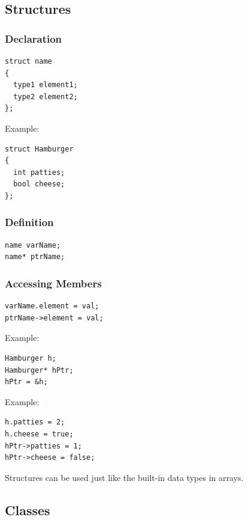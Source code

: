 \documentclass{article}
\begin{document}
\subsection*{Structures}
\subsubsection*{Declaration}
\begin{verbatim}
struct name
{
  type1 element1;
  type2 element2;
};
\end{verbatim}
Example:
\begin{verbatim}
struct Hamburger
{
  int patties;
  bool cheese;
};
\end{verbatim}

\subsubsection*{Definition}
\begin{verbatim}
name varName;
name* ptrName;
\end{verbatim}

\subsubsection*{Accessing Members}
\begin{verbatim}
varName.element = val;
ptrName->element = val;
\end{verbatim}
Example:
\begin{verbatim}
Hamburger h;
Hamburger* hPtr;
hPtr = &h;
\end{verbatim}
Example:
\begin{verbatim}
h.patties = 2;
h.cheese = true;
hPtr->patties = 1;
hPtr->cheese = false;
\end{verbatim}
Structures can be used just like the built-in data types in arrays.

\newpage
\subsection*{Classes}
\end{document}
